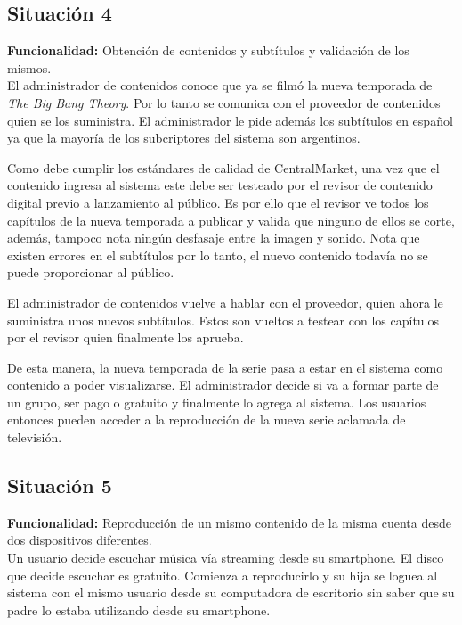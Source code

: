 \documentclass[11pt, a4paper, spanish]{article}
\begin{document}
\subsection{Situaci\'on 4}

	\textbf{Funcionalidad:} Obtenci\'on de contenidos y subt\'itulos y validaci\'on de los mismos.\\

        El administrador de contenidos conoce que ya se film\'o la nueva temporada de \emph{The Big Bang Theory}. Por lo tanto se comunica con el 
   proveedor de contenidos quien se los suministra. El administrador le pide adem\'as los subt\'itulos en espa\~{n}ol ya que la mayor\'ia de los subcriptores del 
   sistema son argentinos.

        Como debe cumplir los est\'andares de calidad de CentralMarket, una vez que el contenido ingresa al sistema este debe ser testeado por el revisor 
   de contenido digital previo a lanzamiento al p\'ublico. Es por ello que el revisor ve todos los cap\'itulos de la nueva temporada a publicar y valida 
   que ninguno de ellos se corte, adem\'as, tampoco nota ning\'un desfasaje entre la imagen y sonido. Nota que existen errores en el subt\'itulos por lo 
   tanto, el nuevo contenido todav\'ia no se puede proporcionar al p\'ublico.
   
      El administrador de contenidos vuelve a hablar con el proveedor, quien ahora le suministra unos nuevos subt\'itulos. Estos son vueltos a testear 
   con los cap\'itulos por el revisor quien finalmente los aprueba.

      De esta manera, la nueva temporada de la serie pasa a estar en el sistema como contenido a poder visualizarse. El administrador decide si va a    
   formar parte de un grupo, ser pago o gratuito y finalmente lo agrega al sistema.
   Los usuarios entonces pueden acceder a la reproducci\'on de la nueva serie aclamada de televisi\'on.

\subsection{Situaci\'on 5}

	\textbf{Funcionalidad:} Reproducci\'on de un mismo contenido de la misma cuenta desde dos dispositivos diferentes.\\

      Un usuario decide escuchar m\'usica v\'ia streaming desde su smartphone. El disco que decide escuchar es gratuito. Comienza a reproducirlo y su hija 
   se loguea al sistema con el mismo usuario desde su computadora de escritorio sin saber que su padre lo estaba utilizando desde su smartphone.\\
\end{document}
